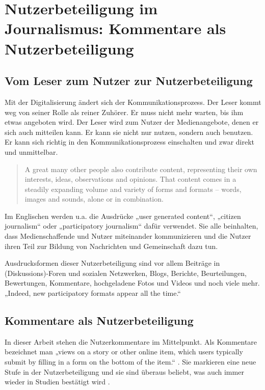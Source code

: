 \chapter{Nutzerbeteiligung im Journalismus: Kommentare als Nutzerbeteiligung}
\label{kap:nutzerbeteiligung}

\section{Vom Leser zum Nutzer zur Nutzerbeteiligung}

Mit der Digitalisierung ändert sich der Kommunikationsprozess. Der Leser kommt
weg von seiner Rolle als reiner Zuhörer. Er muss nicht mehr warten, bis ihm
etwas angeboten wird. Der Leser wird zum Nutzer der Medienangebote, denen er
sich auch mitteilen kann. Er kann sie nicht nur nutzen, sondern auch benutzen.
Er kann sich richtig in den Kommunikationsprozess einschalten und zwar direkt
und unmittelbar.

\begin{quote}
\glqq A great many other people also contribute content, representing their own
interests, ideas, observations and opinions. That content comes in a steadily
expanding volume and variety of forms and formats – words, images and sounds,
alone or in combination.\grqq{} \autocite[S.~1]{participatory}
\end{quote}

Im Englischen werden u.a. die Ausdrücke „user generated content“, „citizen
journalism“ oder „participatory journalism“ \autocite[S.~2]{participatory} dafür
verwendet. Sie alle beinhalten, dass Medienschaffende und Nutzer miteinander
kommunizieren und die Nutzer ihren Teil zur Bildung von Nachrichten und
Gemeinschaft dazu tun.

Ausdrucksformen dieser Nutzerbeteiligung sind vor allem Beiträge in
(Diskussions)-Foren und sozialen Netzwerken, Blogs, Berichte, Beurteilungen,
Bewertungen, Kommentare, hochgeladene Fotos und Videos und noch viele mehr.
„Indeed, new participatory formats appear all the time.“ \autocite[S.~2 und
S.~17]{participatory}


\section{Kommentare als Nutzerbeteiligung}

In dieser Arbeit stehen die Nutzerkommentare im Mittelpunkt. Als Kommentare
bezeichnet man „views on a story or other online item, which users typically
submit by filling in a form on the bottom of the item.“
\autocite[S.~17]{participatory}.  Sie markieren eine neue Stufe in der
Nutzerbeteiligung und sie sind überaus beliebt, was auch immer wieder in Studien
bestätigt wird \autocite[S.~97, Punkt 2]{reich}.


